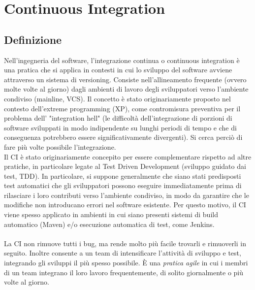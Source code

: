 \documentclass[10pt, a4paper]{article}
\begin{document}
\section{Continuous Integration}
\subsection{Definizione}
Nell'ingegneria del software, l'integrazione continua o continuous integration è una pratica che si applica
in contesti in cui lo sviluppo del software avviene attraverso un sistema di versioning. Consiste
nell'allineamento frequente (ovvero molte volte al giorno) dagli ambienti di lavoro degli
sviluppatori verso l'ambiente condiviso (mainline, VCS). Il concetto è stato originariamente proposto nel
contesto dell'extreme programming (XP), come contromisura preventiva per il problema dell' "integration
hell" (le difficoltà dell'integrazione di porzioni di software sviluppati in modo indipendente su lunghi
periodi di tempo e che di conseguenza potrebbero essere significativamente divergenti). Si cerca perciò di fare più
volte possibile l'integrazione.\\
Il CI è stato originariamente concepito per essere complementare rispetto ad altre pratiche, in particolare
legate al Test Driven Development (sviluppo guidato dai test, TDD). In particolare, si suppone
generalmente che siano stati predisposti test automatici che gli sviluppatori possono eseguire
immediatamente prima di rilasciare i loro contributi verso l'ambiente condiviso, in modo da garantire
che le modifiche non introducano errori nel software esistente. Per questo motivo, il CI viene spesso
applicato in ambienti in cui siano presenti sistemi di build automatico (Maven) e/o esecuzione automatica di
test, come Jenkins.\\\\
La CI non rimuove tutti i bug, ma rende molto più facile trovarli e rimuoverli in seguito. Inoltre consente a un team di intensificare l'attività di sviluppo e test, integrando gli sviluppi il più spesso possibile. È una \textit{pratica agile} in cui i membri di un team integrano il loro lavoro frequentemente, di solito giornalmente o più volte al giorno.
\end{document}
